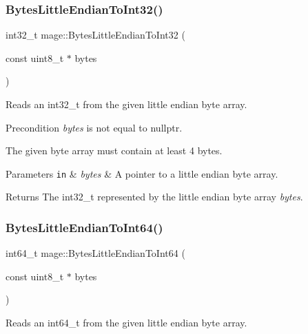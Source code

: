 \subsubsection{\texorpdfstring{Bytes\+Little\+Endian\+To\+Int32()}{BytesLittleEndianToInt32()}}
{\footnotesize\ttfamily int32\+\_\+t mage\+::\+Bytes\+Little\+Endian\+To\+Int32 (\begin{DoxyParamCaption}\item[{const uint8\+\_\+t $\ast$}]{bytes }\end{DoxyParamCaption})\hspace{0.3cm}{\ttfamily [noexcept]}}

Reads an int32\+\_\+t from the given little endian byte array.

\begin{DoxyPrecond}{Precondition}
{\itshape bytes} is not equal to {\ttfamily nullptr}. 

The given byte array must contain at least 4 bytes. 
\end{DoxyPrecond}

\begin{DoxyParams}[1]{Parameters}
\mbox{\tt in}  & {\em bytes} & A pointer to a little endian byte array. \\
\hline
\end{DoxyParams}
\begin{DoxyReturn}{Returns}
The {\ttfamily int32\+\_\+t} represented by the little endian byte array {\itshape bytes}. 
\end{DoxyReturn}
\hypertarget{namespacemage_ae1d9127eb0d3efb51d1b010075b73c05}{}\label{namespacemage_ae1d9127eb0d3efb51d1b010075b73c05} 
\subsubsection{\texorpdfstring{Bytes\+Little\+Endian\+To\+Int64()}{BytesLittleEndianToInt64()}}
{\footnotesize\ttfamily int64\+\_\+t mage\+::\+Bytes\+Little\+Endian\+To\+Int64 (\begin{DoxyParamCaption}\item[{const uint8\+\_\+t $\ast$}]{bytes }\end{DoxyParamCaption})\hspace{0.3cm}{\ttfamily [noexcept]}}

Reads an int64\+\_\+t from the given little endian byte array.

